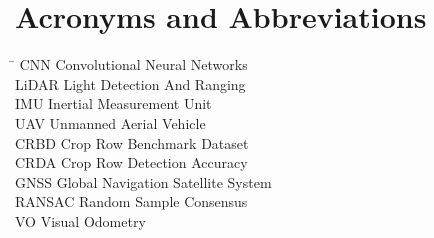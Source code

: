 \section*{Acronyms and Abbreviations}
\begin{tabbing}
 \hspace*{1.6cm}  \= \kill
 CNN \> Convolutional Neural Networks \\[0.5ex]
 LiDAR \> Light Detection And Ranging \\[0.5ex]
 IMU \> Inertial Measurement Unit \\[0.5ex]
 UAV \> Unmanned Aerial Vehicle \\[0.5ex]
 CRBD \> Crop Row Benchmark Dataset  \\[0.5ex]
 CRDA \> Crop Row Detection Accuracy \\[0.5ex]
 GNSS \>  Global Navigation Satellite System   \\[0.5ex]
 RANSAC \> Random Sample Consensus  \\[0.5ex]
 VO \> Visual Odometry  \\[0.5ex]


\end{tabbing}